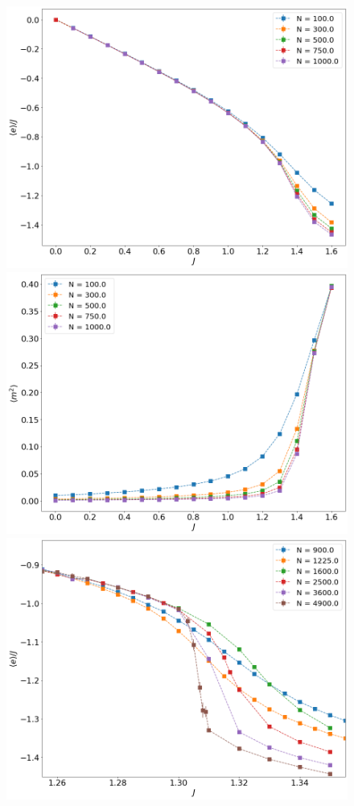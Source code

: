  \begin{figure}[t]
	\centering
	\includegraphics[scale=0.23]{Images/energy_shortchains.png}
	\includegraphics[scale=0.23]{Images/magnetization2_shortchains.png} \\
	\includegraphics[scale=0.23]{Images/energy_longchains.png}

\end{figure}
